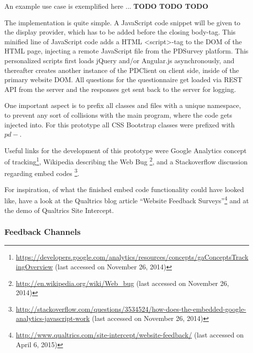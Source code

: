 		An example use case is exemplified here ... \textbf{TODO TODO TODO}
		


		The implementation is quite simple. A JavaScript code snippet will be given to the display provider, which has to be added before the closing body-tag. This minified line of JavaScript code adds a HTML <script>-tag to the DOM of the HTML page, injecting a remote JavaScript file from the PDSurvey platform. This personalized scripts first loads jQuery and/or Angular.js asynchronously, and thereafter creates another instance of the PDClient on client side, inside of the primary website DOM. All questions for the questionnaire get loaded via REST API from the server and the responses get sent back to the server for logging.


		One important aspect is to prefix all classes and files with a unique namespace, to prevent any sort of collisions with the main program, where the code gets injected into. For this prototype all CSS Bootstrap classes were prefixed with $pd-$.

		Useful links for the development of this prototype were Google Analytics concept of tracking\footnote{\url{https://developers.google.com/analytics/resources/concepts/gaConceptsTrackingOverview} (last accessed on November 26, 2014)}, Wikipedia describing the Web Bug \footnote{\url{http://en.wikipedia.org/wiki/Web_bug} (last accessed on November 26, 2014)}, and a Stackoverflow discussion regarding embed codes \footnote{\url{http://stackoverflow.com/questions/3534524/how-does-the-embedded-google-analytics-javascript-work} (last accessed on November 26, 2014)}.

		For inspiration, of what the finished embed code functionality could have looked like, have a look at the Qualtrics blog article ``Website Feedback Surveys''\footnote{\url{http://www.qualtrics.com/site-intercept/website-feedback/} (last accessed on April 6, 2015)} and at the demo of Qualtrics Site Intercept.



	\subsubsection{Feedback Channels}

